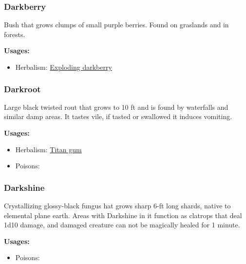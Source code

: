 \subsubsection{Darkberry}
\label{Darkberry}

Bush that grows clumps of small purple berries. Found on graslands and in forests.

\vspace{5mm}

\textbf{Usages:}

\begin{itemize}[noitemsep]
\item[] Herbalism: \hyperref[Exploding darkberry]{Exploding darkberry}
\end{itemize}

\subsubsection{Darkroot}
\label{Darkroot}

Large black twisted rout that grows to 10 ft and is found by waterfalls and similar damp areas. It tastes vile, if tasted or swallowed it induces vomiting.

\vspace{5mm}

\textbf{Usages:}

\begin{itemize}[noitemsep]
\item[] Herbalism: \hyperref[Titan gum]{Titan gum}
\item[] Poisons: \poison
\end{itemize}

\subsubsection{Darkshine}
\label{Darkshine}

Crystallizing glossy-black fungus hat grows sharp 6-ft long shards, native to elemental plane earth. Areas with Darkshine in it function as clatrops that deal 1d10 damage, and damaged creature can not be magically healed for 1 minute.

\vspace{5mm}

\textbf{Usages:}

\begin{itemize}[noitemsep]
\item[] Poisons: \poison\poison
\end{itemize}

